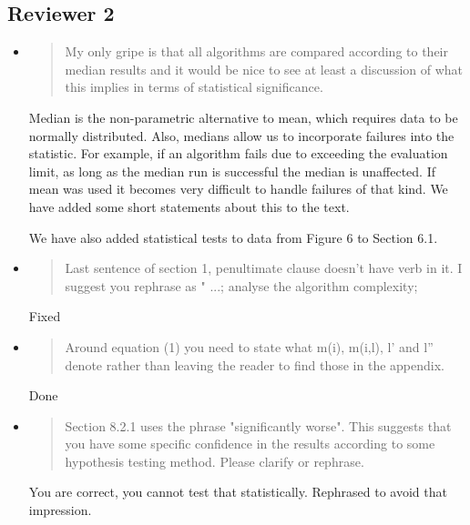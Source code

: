 \documentclass[]{article}
\begin{document}
\subsection{Reviewer 2}
\begin{itemize}

\item
\begin{quote}
My only gripe is that all algorithms are compared according to their median results and it would be nice to see at least a discussion of what this implies in terms of statistical significance.
\end{quote}

Median is the non-parametric alternative to mean, which requires data to be normally distributed.
Also, medians allow us to incorporate failures into the statistic. For example, if an algorithm fails due to
exceeding the evaluation limit, as long as the median run is successful the median is unaffected. If mean was used
it becomes very difficult to handle failures of that kind. We have added some short statements about this to the text.

We have also added statistical tests to data from Figure 6 to Section 6.1.

\item
\begin{quote}
Last sentence of section 1, penultimate clause doesn't have  verb in it. I suggest you rephrase as " ...; analyse the algorithm complexity; 
\end{quote}

Fixed

\item
\begin{quote}
Around equation (1) you need to state what m(i), m(i,l), l' and l'' denote rather than leaving the reader to find those in the appendix.
\end{quote}

Done

\item
\begin{quote}
Section 8.2.1 uses the phrase "significantly worse".  This suggests that you have some specific confidence in the results according to some hypothesis testing method.  Please clarify or rephrase.
\end{quote}

You are correct, you cannot test that statistically. Rephrased to avoid that impression.

\end{itemize}
\end{document}
